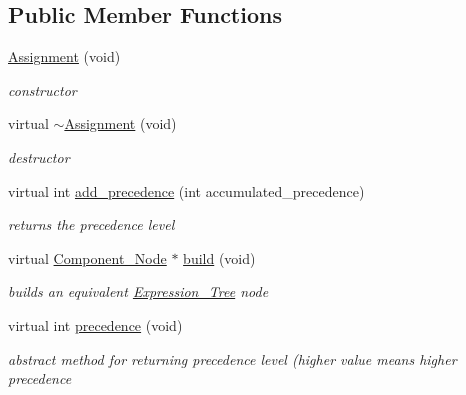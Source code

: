 \subsection*{Public Member Functions}
\begin{DoxyCompactItemize}
\item 
\hyperlink{classMadara_1_1Expression__Tree_1_1Assignment_a4b7ca14d2e155c8f3316df83bb9f221a}{Assignment} (void)
\begin{DoxyCompactList}\small\item\em constructor \item\end{DoxyCompactList}\item 
virtual \hyperlink{classMadara_1_1Expression__Tree_1_1Assignment_a3435ee30e6bee0cb7ce34690d8409be1}{$\sim$Assignment} (void)
\begin{DoxyCompactList}\small\item\em destructor \item\end{DoxyCompactList}\item 
virtual int \hyperlink{classMadara_1_1Expression__Tree_1_1Assignment_ab5825e4e878a4f653bb5f39180e36a20}{add\_\-precedence} (int accumulated\_\-precedence)
\begin{DoxyCompactList}\small\item\em returns the precedence level \item\end{DoxyCompactList}\item 
virtual \hyperlink{classMadara_1_1Expression__Tree_1_1Component__Node}{Component\_\-Node} $\ast$ \hyperlink{classMadara_1_1Expression__Tree_1_1Assignment_a5e7c637ba473a8bd31177665cb6b84df}{build} (void)
\begin{DoxyCompactList}\small\item\em builds an equivalent \hyperlink{classMadara_1_1Expression__Tree_1_1Expression__Tree}{Expression\_\-Tree} node \item\end{DoxyCompactList}\item 
virtual int \hyperlink{classMadara_1_1Expression__Tree_1_1Symbol_ac060dedb8d16864591b259df375109b3}{precedence} (void)
\begin{DoxyCompactList}\small\item\em abstract method for returning precedence level (higher value means higher precedence \item\end{DoxyCompactList}\end{DoxyCompactItemize}
